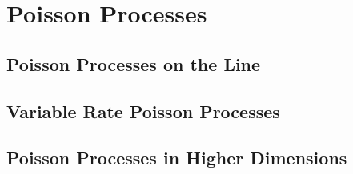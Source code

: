 \chapter{Poisson Processes}
\section{Poisson Processes on the Line}
\section{Variable Rate Poisson Processes}
\section{Poisson Processes in Higher Dimensions}
